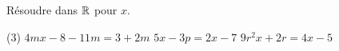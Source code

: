 \documentclass[a4paper,12pt]{report}
\begin{document}
\begin{boiteExT}
	\vspace{8cm}

\end{boiteExT}


\begin{boiteExT}
	\vspace{6cm}

\end{boiteExT}

\begin{boiteExT}[Exemple 1]
	\vspace{6cm}

\end{boiteExT}


\begin{boiteExT}[Exemple 2]
	\vspace{6cm}

\end{boiteExT}

\begin{boiteExT}[Exemple 3] 
	\vspace{6cm}

\end{boiteExT}

\begin{boiteExT}[Exemple 4]
	\vspace{6cm}

\end{boiteExT}
\begin{exo}
Résoudre dans $\mathbb R$ pour $x$.
\begin{tasks}(3)
	\task $4 m x-8-11 m=3+2 m$
	\task $5x-3p=2x-7$
	\task $9r^2x+2r=4x-5$
\end{tasks}
\end{exo}
\end{document}

